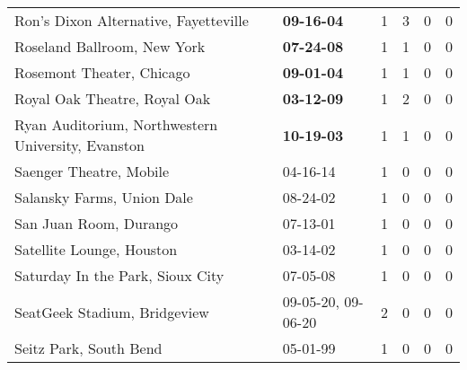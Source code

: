 \begin{longtable}{p{}p{}p{}p{}p{}p{}}
                                        Ron's Dixon Alternative, Fayetteville &                                       \textbf{09-16-04\textsuperscript{}} &  1 &  3 &  0 &  0 \\
                                                  Roseland Ballroom, New York &                                       \textbf{07-24-08\textsuperscript{}} &  1 &  1 &  0 &  0 \\
                                                    Rosemont Theater, Chicago &                                       \textbf{09-01-04\textsuperscript{}} &  1 &  1 &  0 &  0 \\
                                                 Royal Oak Theatre, Royal Oak &                                       \textbf{03-12-09\textsuperscript{}} &  1 &  2 &  0 &  0 \\
                           Ryan Auditorium, Northwestern University, Evanston &                                       \textbf{10-19-03\textsuperscript{}} &  1 &  1 &  0 &  0 \\
                                                      Saenger Theatre, Mobile &                                                04-16-14\textsuperscript{} &  1 &  0 &  0 &  0 \\
                                                   Salansky Farms, Union Dale &                                                08-24-02\textsuperscript{} &  1 &  0 &  0 &  0 \\
                                                       San Juan Room, Durango &                                                07-13-01\textsuperscript{} &  1 &  0 &  0 &  0 \\
                                                    Satellite Lounge, Houston &                                                03-14-02\textsuperscript{} &  1 &  0 &  0 &  0 \\
                                             Saturday In the Park, Sioux City &                                                07-05-08\textsuperscript{} &  1 &  0 &  0 &  0 \\
                                                 SeatGeek Stadium, Bridgeview &                    09-05-20\textsuperscript{}, 09-06-20\textsuperscript{} &  2 &  0 &  0 &  0 \\
                                                       Seitz Park, South Bend &                                                05-01-99\textsuperscript{} &  1 &  0 &  0 &  0 \\

\end{longtable}
